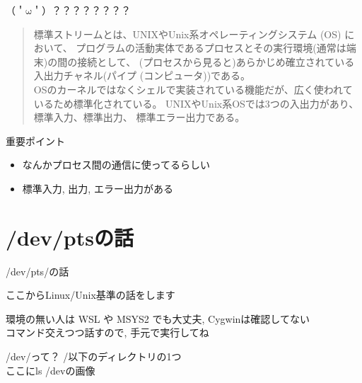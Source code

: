 \documentclass[uplatex, dvipdfmx, unicode]{beamer}
\begin{document}
\begin{frame}
  \centering
  \Huge{（＇$\mathrm{\omega}$＇）？？？？？？？？}
\end{frame}

\begin{frame}
  \begin{quote}
    標準ストリームとは、UNIXやUnix系オペレーティングシステム (OS) において、
    \alert{プログラムの活動実体であるプロセスとその実行環境(通常は端末)の間の接続}として、
    (プロセスから見ると)あらかじめ確立されている\alert{入出力チャネル}(パイプ (コンピュータ))である。 \\
    OSのカーネルではなくシェルで実装されている機能だが、広く使われているため標準化されている。
    UNIXやUnix系OSでは3つの入出力があり、\alert{標準入力、標準出力、
    標準エラー出力}である。
  \end{quote}
\end{frame}

\begin{frame}{重要ポイント}
  \begin{itemize}
    \item{なんかプロセス間の通信に使ってるらしい}
    \item{標準入力, 出力, エラー出力がある}
  \end{itemize}
\end{frame}

\section{/dev/ptsの話}

\begin{frame}
  \Huge{\alert{/dev/pts/の話}}
\end{frame}

\begin{frame}
  \Large{\alert{ここからLinux/Unix基準の話をします}} \\
  \vspace{0.2in}

  \normalsize
  環境の無い人は WSL や MSYS2 でも大丈夫, Cygwinは確認してない \\
  コマンド交えつつ話すので, 手元で実行してね
\end{frame}

\begin{frame}{/dev/って？}
  /以下のディレクトリの1つ \\
  \vspace{0.2in}
  ここにls /devの画像
\end{frame}
\end{document}
